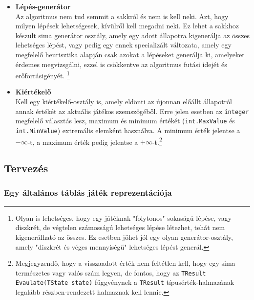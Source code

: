\documentclass[twoside, a4paper, 12pt]{article}
\begin{document}
\begin{itemize}
	\item \textbf{Lépés-generátor} \\
	Az algoritmus nem tud semmit a sakkról és nem is kell neki. Azt, hogy milyen lépések lehetségesek, kívülről kell megadni neki. Ez lehet a sakkhoz készült sima generátor osztály, amely egy adott állapotra kigenerálja az összes lehetséges lépést, vagy pedig egy ennek specializált változata, amely egy megfelelő heurisztika alapján csak azokat a lépéseket generálja ki, amelyeket érdemes megvizsgálni, ezzel is csökkentve az algoritmus futási idejét és erőforrásigényét. \footnote{Olyan is lehetséges, hogy egy játéknak "folytonos" sokaságú lépése, vagy diszkrét, de végtelen számosságú lehetséges lépése létezhet, tehát nem kigenerálható az összes. Ez esetben jöhet jól egy olyan generátor-osztály, amely "diszkrét és véges mennyiségű" lehetséges lépést generál.}
	
	\item \textbf{Kiértékelő} \\
	Kell egy kiértékelő-osztály is, amely eldönti az újonnan előállt állapotról annak értékét az aktuális játékos szemszögéből. Erre jelen esetben az \texttt{integer} megfelelő választás lesz, maximum és minimum értékét (\texttt{int.MaxValue} és \texttt{int.MinValue}) extremális elemként használva. A minimum érték jelentse a $-\infty$-t, a maximum érték pedig jelentse a $+\infty$-t.\footnote{Megjegyzendő, hogy a visszaadott érték nem feltétlen kell, hogy egy sima természetes vagy valós szám legyen, de fontos, hogy az \texttt{TResult Evaulate(TState state)} függvénynek a \texttt{TResult} típusérték-halmazának legalább részben-rendezett halmaznak kell lennie.}
\end{itemize}























\subsection{Tervezés}
\subsubsection{Egy általános táblás játék reprezentációja}
\end{document}
